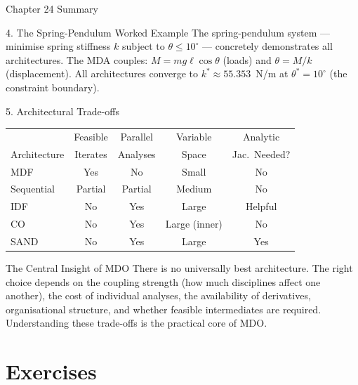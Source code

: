 \documentclass[aspectratio=169,10pt]{beamer}
\begin{document}
\begin{frame}[allowframebreaks]{Chapter 24 Summary}
  \framebreak

  \begin{block}{4. The Spring-Pendulum Worked Example}
    The spring-pendulum system --- minimise spring stiffness $k$ subject to
    $\theta \leq 10^\circ$ --- concretely demonstrates all architectures.
    The MDA couples: $M = mg\ell\cos\theta$ (loads) and $\theta = M/k$
    (displacement).  All architectures converge to $k^* \approx 55.353$~N/m
    at $\theta^* = 10^\circ$ (the constraint boundary).
  \end{block}

  \begin{block}{5. Architectural Trade-offs}
    \begin{tabular}{@{}lcccc@{}}
      \toprule
      & Feasible & Parallel & Variable & Analytic \\
      Architecture & Iterates & Analyses & Space & Jac.\ Needed? \\
      \midrule
      MDF      & Yes & No  & Small  & No \\
      Sequential & Partial & Partial & Medium & No \\
      IDF      & No  & Yes & Large  & Helpful \\
      CO       & No  & Yes & Large (inner) & No \\
      SAND     & No  & Yes & Large  & Yes \\
      \bottomrule
    \end{tabular}
  \end{block}

  \begin{alertblock}{The Central Insight of MDO}
    There is no universally best architecture.  The right choice depends
    on the coupling strength (how much disciplines affect one another),
    the cost of individual analyses, the availability of derivatives,
    organisational structure, and whether feasible intermediates are required.
    Understanding these trade-offs is the practical core of MDO.
  \end{alertblock}

\end{frame}

\section{Exercises}
\end{document}
